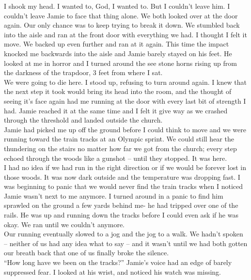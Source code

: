 \documentclass[a5paper]{scrartcl}
\begin{document}
I shook my head. I wanted to, God, I wanted to. But I couldn't leave him. I couldn't leave Jamie to face that thing alone. We both looked over at the door again. Our only chance was to keep trying to break it down. We stumbled back into the aisle and ran at the front door with everything we had. I thought I felt it move. We backed up even further and ran at it again. This time the impact knocked me backwards into the aisle and Jamie barely stayed on his feet. He looked at me in horror and I turned around the see stone horns rising up from the darkness of the trapdoor, 3 feet from where I sat. \\


We were going to die here. I stood up, refusing to turn around again. I knew that the next step it took would bring its head into the room, and the thought of seeing it's face again had me running at the door with every last bit of strength I had. Jamie reached it at the same time and I felt it give way as we crashed through the threshold and landed outside the church.\\


Jamie had picked me up off the ground before I could think to move and we were running toward the train tracks at an Olympic sprint. We could still hear the thundering on the stairs no matter how far we got from the church; every step echoed through the woods like a gunshot – until they stopped. It was here.\\


I had no idea if we had run in the right direction or if we would be forever lost in those woods. It was now dark outside and the temperature was dropping fast. I was beginning to panic that we would never find the train tracks when I noticed Jamie wasn't next to me anymore. I turned around in a panic to find him sprawled on the ground a few yards behind me- he had tripped over one of the rails. He was up and running down the tracks before I could even ask if he was okay. We ran until we couldn't anymore.\\


Our running eventually slowed to a jog and the jog to a walk. We hadn't spoken – neither of us had any idea what to say – and it wasn't until we had both gotten our breath back that one of us finally broke the silence.\\


\enquote{How long have we been on the tracks?} Jamie's voice had an edge of barely suppressed fear. I looked at his wrist, and noticed his watch was missing.\\
\end{document}
